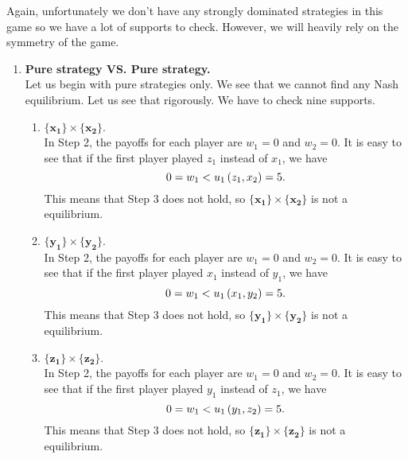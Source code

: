 Again, unfortunately we don't have any strongly dominated strategies in this game so we have a lot of supports to check.
However, we will heavily rely on the symmetry of the game.

\begin{enumerate} [label=\Alph*. ]
    \item \textbf{Pure strategy VS. Pure strategy.} \\
Let us begin with pure strategies only. We see that we cannot find any Nash equilibrium. Let us see that rigorously. We have to check nine supports.

\begin{enumerate} [label*= (\arabic*)]
	\item $\mathbf{\{x_1\}} \times \mathbf{\{x_2\}}$. \\
	      In Step 2, the payoffs for each player are $w_1 = 0$ and $w_2 = 0$. It is easy to see that if the first player played $z_1$ instead of $x_1$, we have
	      \begin{equation*}
	      	0 = w_1 < u_1 \left(z_1, x_2\right) = 5.
	      \end{equation*}
	      This means that Step 3 does not hold, so $\mathbf{\{x_1\}} \times \mathbf{\{x_2\}}$ is not a equilibrium.
	      
	\item $\mathbf{\{y_1\}} \times \mathbf{\{y_2\}}$. \\
	      In Step 2, the payoffs for each player are $w_1 = 0$ and $w_2 = 0$. It is easy to see that if the first player played $x_1$ instead of $y_1$, we have
	      \begin{equation*}
	      	0 = w_1 < u_1 \left(x_1, y_2\right) = 5.
	      \end{equation*}
	      This means that Step 3 does not hold, so $\mathbf{\{y_1\}} \times \mathbf{\{y_2\}}$ is not a equilibrium.
	      
	\item $\mathbf{\{z_1\}} \times \mathbf{\{z_2\}}$. \\
	      In Step 2, the payoffs for each player are $w_1 = 0$ and $w_2 = 0$. It is easy to see that if the first player played $y_1$ instead of $z_1$, we have
	      \begin{equation*}
	      	0 = w_1 < u_1 \left(y_1, z_2\right) = 5.
	      \end{equation*}
	      This means that Step 3 does not hold, so $\mathbf{\{z_1\}} \times \mathbf{\{z_2\}}$ is not a equilibrium.
	          
	          
	          

\end{enumerate}
\end{enumerate}
